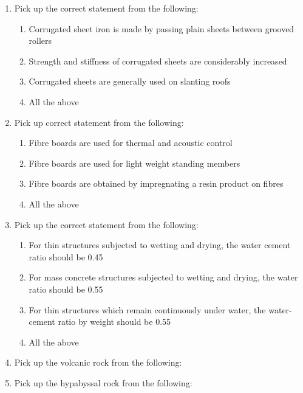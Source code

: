 \documentclass[11pt,a4paper]{article}
\begin{document}
\begin{enumerate}
\begin{enumerate}[label=\Alph*.]
\end{enumerate}
\item{Pick up the correct statement from the following:}
\begin{enumerate}[label=\Alph*.]
\item{Corrugated sheet iron is made by passing plain sheets between grooved rollers}
\item{Strength and stiffness of corrugated sheets are considerably increased}
\item{Corrugated sheets are generally used on slanting roofs}
\item{All the above}
\end{enumerate}
\item{Pick up correct statement from the following:}
\begin{enumerate}[label=\Alph*.]
\item{Fibre boards are used for thermal and acoustic control}
\item{Fibre boards are used for light weight standing members}
\item{Fibre boards are obtained by impregnating a resin product on fibres}
\item{All the above}
\end{enumerate}
\item{Pick up the correct statement from the following:}
\begin{enumerate}[label=\Alph*.]
\item{For thin structures subjected to wetting and drying, the water cement ratio should be 0.45}
\item{For mass concrete structures subjected to wetting and drying, the water ratio should be 0.55}
\item{For thin structures which remain continuously under water, the water-cement ratio by weight should be 0.55}
\item{All the above}
\end{enumerate}
\item{Pick up the volcanic rock from the following:}
\\
\item{Pick up the hypabyssal rock from the following:}

\end{enumerate}
\end{document}
